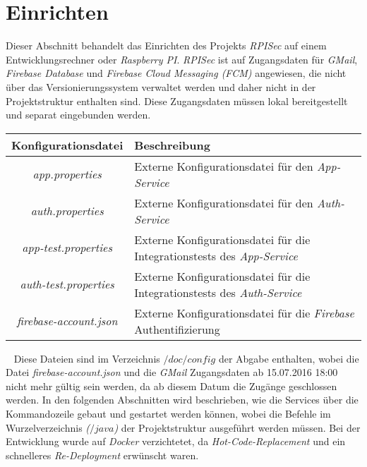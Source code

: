 \documentclass[]{article}
\begin{document}
\section{Einrichten}
Dieser Abschnitt behandelt das Einrichten des Projekts \emph{RPISec} auf einem Entwicklungsrechner oder \emph{Raspberry PI}. \emph{RPISec} ist auf Zugangsdaten für \emph{GMail}, \emph{Firebase Database} und \emph{Firebase Cloud Messaging (FCM)} angewiesen, die nicht über das Versionierungssystem verwaltet werden und daher nicht in der Projektstruktur enthalten sind. Diese Zugangsdaten müssen lokal bereitgestellt und separat eingebunden werden.
{\renewcommand{\arraystretch}{2}%
\begin{center}
	\begin{tabular}{| c | l |}
		\hline
		\textbf{Konfigurationsdatei} & \textbf{Beschreibung}  \\ \hline
		\textit{app.properties} & Externe Konfigurationsdatei für den \emph{App-Service} \\ \hline
		\textit{auth.properties} & Externe Konfigurationsdatei für den \emph{Auth-Service} \\ \hline
		\textit{app-test.properties} & Externe Konfigurationsdatei für die Integrationstests des \emph{App-Service} \\ \hline
		\textit{auth-test.properties} & Externe Konfigurationsdatei für die Integrationstests des \emph{Auth-Service} \\ \hline
		\textit{firebase-account.json} & Externe Konfigurationsdatei für die \emph{Firebase} Authentifizierung \\ \hline
	\end{tabular}
\end{center}
\ \newline
Diese Dateien sind im Verzeichnis \emph{$/doc/config$} der Abgabe enthalten, wobei die Datei \emph{firebase-account.json} und die \emph{GMail} Zugangsdaten ab 15.07.2016 18:00 nicht mehr gültig sein werden, da ab diesem Datum die Zugänge geschlossen werden.
\newline
\newline
In den folgenden Abschnitten wird beschrieben, wie die Services über die Kommandozeile gebaut und gestartet werden können, wobei die Befehle im Wurzelverzeichnis \emph{($/java$)} der Projektstruktur ausgeführt werden müssen. 
\newline
\newline
Bei der Entwicklung wurde auf \emph{Docker} verzichtetet, da \emph{Hot-Code-Replacement} und ein schnelleres \emph{Re-Deployment} erwünscht waren.

}
\end{document}
